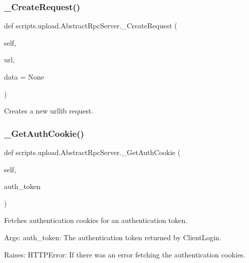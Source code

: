 \subsubsection{\texorpdfstring{\_CreateRequest()}{\_CreateRequest()}}
{\footnotesize\ttfamily def scripts.\+upload.\+Abstract\+Rpc\+Server.\+\_\+\+Create\+Request (\begin{DoxyParamCaption}\item[{}]{self,  }\item[{}]{url,  }\item[{}]{data = {\ttfamily None} }\end{DoxyParamCaption})\hspace{0.3cm}{\ttfamily [private]}}

\begin{DoxyVerb}Creates a new urllib request.\end{DoxyVerb}
 \mbox{\label{classscripts_1_1upload_1_1_abstract_rpc_server_abfb8b9870a888e2e3bad28855cba1997}} 
\subsubsection{\texorpdfstring{\_GetAuthCookie()}{\_GetAuthCookie()}}
{\footnotesize\ttfamily def scripts.\+upload.\+Abstract\+Rpc\+Server.\+\_\+\+Get\+Auth\+Cookie (\begin{DoxyParamCaption}\item[{}]{self,  }\item[{}]{auth\+\_\+token }\end{DoxyParamCaption})\hspace{0.3cm}{\ttfamily [private]}}

\begin{DoxyVerb}Fetches authentication cookies for an authentication token.

Args:
  auth_token: The authentication token returned by ClientLogin.

Raises:
  HTTPError: If there was an error fetching the authentication cookies.
\end{DoxyVerb}
 \mbox{\label{classscripts_1_1upload_1_1_abstract_rpc_server_a36f279120cf46eb30e86ac16657a7db6}} 
